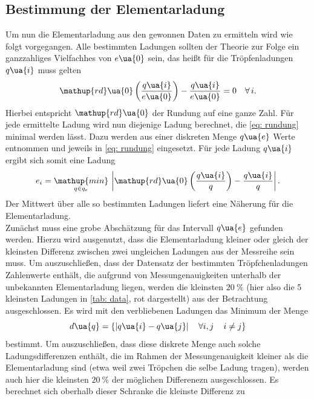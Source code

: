 \subsection{Bestimmung der Elementarladung}
Um nun die Elementarladung aus den gewonnen Daten zu ermitteln wird wie folgt vorgegangen. Alle bestimmten
Ladungen sollten der Theorie zur Folge ein ganzzahliges Vielfachhes von $e\ua{0}$ sein, das heißt für die
Tröpfenladungen $q\ua{i}$ muss gelten
\begin{equation}
  \mathup{rd}\ua{0}\left(\frac{q\ua{i}}{e\ua{0}}\right) - \frac{q\ua{i}}{e\ua{0}} = 0 \quad \forall\, i.
  \label{eq: rundung}
\end{equation}
Hierbei entspricht $\mathup{rd}\ua{0}$ der Rundung auf eine ganze Zahl. Für jede ermittelte Ladung wird nun diejenige
Ladung berechnet, die \eqref{eq: rundung} minimal werden lässt. Dazu werden aus einer diskreten Menge $q\ua{e}$ Werte entnommen
und jeweils in \eqref{eq: rundung} eingesetzt. Für jede Ladung $q\ua{i}$ ergibt sich somit eine Ladung
\begin{equation}
  e_i = \underset{q \in q_e}{\mathup{min}}\, \left|\mathup{rd}\ua{0}\left(\frac{q\ua{i}}{q}\right) - \frac{q\ua{i}}{q}\right|.
\end{equation}
Der Mittwert über alle so bestimmten Ladungen liefert eine Näherung für die Elementarladung.\\
Zunächst muss eine grobe Abschätzung für das Intervall $q\ua{e}$ gefunden werden. Hierzu wird ausgenutzt, dass die Elementarladung
kleiner oder gleich der kleinsten Differenz zwischen zwei ungleichen Ladungen aus der Messreihe sein muss. Um auszuschließen, dass
der Datensatz der bestimmten Tröpfchenladungen Zahlenwerte enthält, die aufgrund von Messungenauigkeiten unterhalb
der unbekannten Elementarladung liegen, werden die kleinsten $\SI{20}{\percent}$ (hier also die 5 kleinsten Ladungen in \ref{tab: data}, rot dargestellt)
aus der Betrachtung ausgeschlossen. Es wird mit den verbliebenen Ladungen das Minimum der Menge
\begin{equation}
  d\ua{q} = \left\{ \left| q\ua{i} - q\ua{j}\right| \quad \forall  i, j \, \quad i \neq j   \right\}
\end{equation}
bestimmt. Um auszuschließen, dass diese diskrete Menge auch solche Ladungsdifferenzen enthält, die im Rahmen der Messungenauigkeit
kleiner als die Elementarladung sind (etwa weil zwei Tröpchen die selbe Ladung tragen), werden auch hier die kleinsten $\SI{20}{\percent}$ der möglichen Differenezn ausgeschlossen.
Es berechnet sich oberhalb dieser Schranke die kleinste Differenz zu
